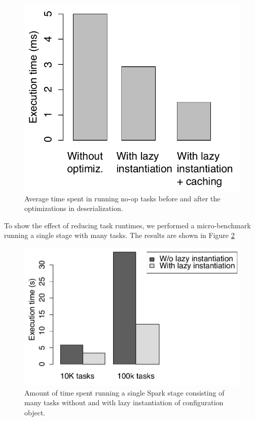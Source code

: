 \begin{figure}[t!]
 \begin{center}
   \includegraphics[scale=0.60]{images_graphs/optimizations/graph3/runtime_optimizations.pdf}
 \end{center}
 \caption{Average time spent in running no-op tasks before and after the optimizations in deserialization.}
 \label{fig:runtime_optimizations}
\end{figure}

To show the effect of reducing task runtimes, we performed a micro-benchmark running a single stage with many tasks. The results are shown in Figure \ref{fig:lazy_micro}

\begin{figure}[t!]
 \begin{center}
   \includegraphics[scale=0.50]{images_graphs/optimizations/graph1/lazy_micro.pdf}
 \end{center}
 \caption{Amount of time spent running a single Spark stage consisting of many tasks without and with lazy instantiation of configuration object.}
 \label{fig:lazy_micro}
\end{figure}

